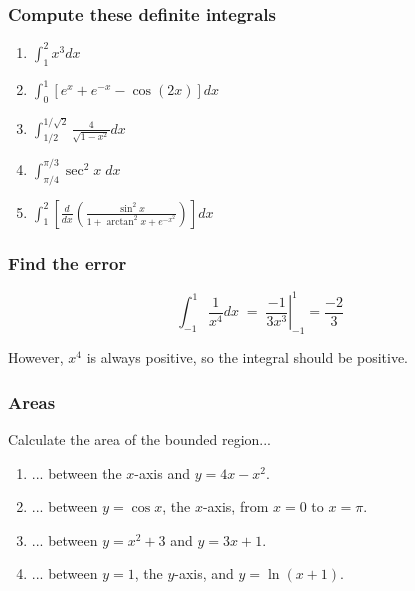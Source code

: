 \begin{frame}[t]
	\frametitle{Compute these definite integrals}

	\begin{enumerate}
		\item $\displaystyle \int_{1}^{2}x^{3}dx$
			\vfill

		\item $\displaystyle \int_{0}^{1}\left[ e^{x}+ e^{-x}- \cos (2x) \right] dx$
			\vfill

		\item $\displaystyle \int_{1/2}^{1/\sqrt{2}}\frac{4}{\sqrt{1-x^{2}}}dx$
			\vfill

		\item $\displaystyle \int_{\pi/4}^{\pi/3}\sec^{2}x \; dx$
			\vfill

		\item $\displaystyle \int_{1}^{2}\left[ \frac{d}{dx}\left( \frac{\sin^{2}x }{1
			+ \arctan^{2}x + e^{-x^2}}\right) \right] dx$
			\vfill
	\end{enumerate}
\end{frame}

\begin{frame}[t]
	\frametitle{Find the error}

	\[
		\int_{-1}^{1}\frac{1}{x^{4}}dx \; = \; \left. \frac{-1}{3x^{3}}\right\vert_{-1}
		^{1}= \frac{-2}{3}
	\]

	However, $x^{4}$ is always positive, so the integral should be positive.
\end{frame}

\begin{frame}[t]
	\frametitle{Areas}

	Calculate the area of the bounded region...
	\vspace{.2cm}
	\begin{enumerate}
		\item ... between the $x$-axis and $\displaystyle y=4x-x^{2}$.
			\vspace{.2cm}

		\item ... between $y=\cos x$, the $x$-axis, from $x=0$ to $x=\pi$.
			\vspace{.2cm}

		\item ... between $\displaystyle y=x^{2}+3$ and $\displaystyle y=3x+1$.
			\vspace{.2cm}

		\item ... between $y=1$, the $y$-axis, and $y=\ln(x+1)$.
	\end{enumerate}
\end{frame}

